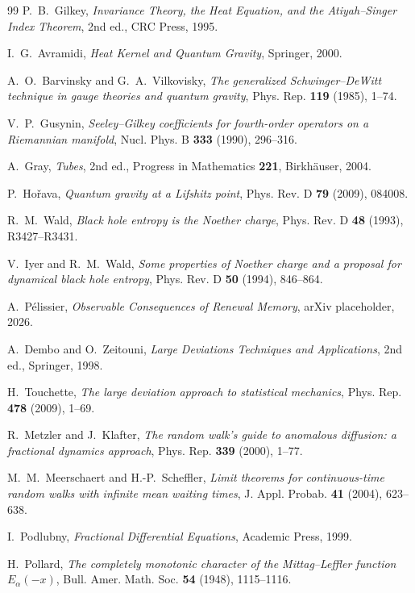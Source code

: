 \documentclass[11pt]{article}
\theoremstyle{definition}
\theoremstyle{remark}
\begin{document}
\begin{thebibliography}{99}
P.~B.~Gilkey, \emph{Invariance Theory, the Heat Equation, and the Atiyah--Singer
Index Theorem}, 2nd ed., CRC Press, 1995.

I.~G.~Avramidi, \emph{Heat Kernel and Quantum Gravity}, Springer, 2000.

A.~O.~Barvinsky and G.~A.~Vilkovisky,
\emph{The generalized Schwinger--DeWitt technique in gauge theories and quantum
gravity}, Phys. Rep. \textbf{119} (1985), 1--74.

V.~P.~Gusynin,
\emph{Seeley--Gilkey coefficients for fourth-order operators on a Riemannian
manifold}, Nucl. Phys. B \textbf{333} (1990), 296--316.

A.~Gray, \emph{Tubes}, 2nd ed., Progress in Mathematics \textbf{221},
Birkh\"auser, 2004.

P.~Ho\v{r}ava,
\emph{Quantum gravity at a Lifshitz point},
Phys. Rev. D \textbf{79} (2009), 084008.

R.~M.~Wald, \emph{Black hole entropy is the Noether charge},
Phys. Rev. D \textbf{48} (1993), R3427--R3431.

V.~Iyer and R.~M.~Wald,
\emph{Some properties of Noether charge and a proposal for dynamical black hole
entropy}, Phys. Rev. D \textbf{50} (1994), 846--864.

A.~P\'elissier, \emph{Observable Consequences of Renewal Memory},
arXiv placeholder, 2026.

A.~Dembo and O.~Zeitouni,
\emph{Large Deviations Techniques and Applications}, 2nd ed.,
Springer, 1998.

H.~Touchette,
\emph{The large deviation approach to statistical mechanics},
Phys. Rep. \textbf{478} (2009), 1--69.

R.~Metzler and J.~Klafter,
\emph{The random walk's guide to anomalous diffusion: a fractional dynamics approach},
Phys. Rep. \textbf{339} (2000), 1--77.

M.~M.~Meerschaert and H.-P.~Scheffler,
\emph{Limit theorems for continuous-time random walks with infinite mean waiting times},
J. Appl. Probab. \textbf{41} (2004), 623--638.

I.~Podlubny,
\emph{Fractional Differential Equations},
Academic Press, 1999.

H.~Pollard,
\emph{The completely monotonic character of the Mittag--Leffler function
\(E_\alpha(-x)\)},
Bull. Amer. Math. Soc. \textbf{54} (1948), 1115--1116.


\end{thebibliography}
\end{document}

